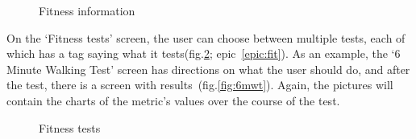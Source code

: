 \begin{figure}[h!]
    \centering
    \hfill
    \caption{Fitness information}
    \label{fig:fitnessInfo}
\end{figure}

On the `Fitness tests' screen, the user can choose between multiple tests, each of which has a tag saying what it tests(fig.\ref{fig:fitnessTests}; epic~\ref{epic:fit}).
As an example, the `6 Minute Walking Test' screen has directions on what the user should do, and after the test, there is a screen with results~(fig.\ref{fig:6mwt}).
Again, the pictures will contain the charts of the metric's values over the course of the test.

\begin{figure}[h!]
    \centering
    \hfill
    \caption{Fitness tests}
    \label{fig:fitnessTests}
\end{figure}

